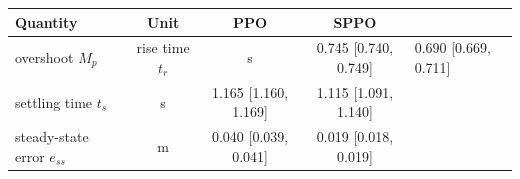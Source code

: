 \begin{tabular}{lccc}
\toprule
Quantity & Unit & PPO & SPPO \\
\midrule
overshoot $M_p$ & %
rise time $t_r$ & s & 0.745  [0.740, 0.749] & 0.690  [0.669, 0.711] \\
settling time $t_s$ & s & 1.165  [1.160, 1.169] & 1.115  [1.091, 1.140] \\
steady-state error $e_{ss}$ & m & 0.040  [0.039, 0.041] & 0.019  [0.018, 0.019] \\
\bottomrule
\end{tabular}
